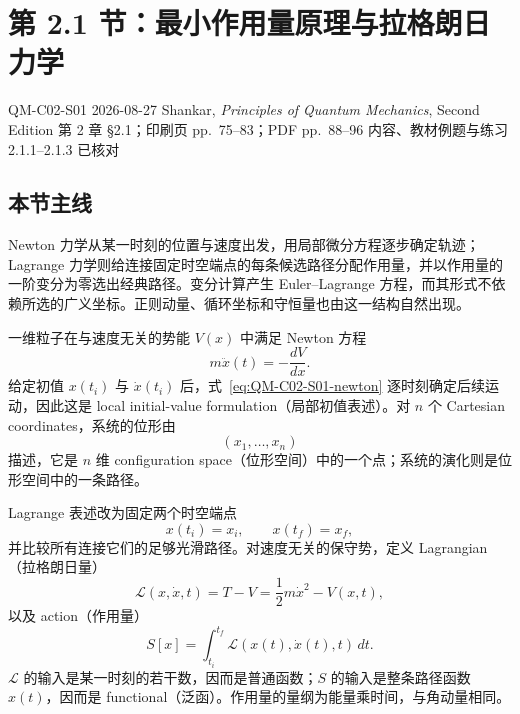 \section{第 2.1 节：最小作用量原理与拉格朗日力学}
\label{section:QM-C02-S01}

\studymeta
  {QM-C02-S01}
  {2026-08-27}
  {Shankar, \textit{Principles of Quantum Mechanics}, Second Edition}
  {第 2 章 \S 2.1；印刷页 pp.~75--83；PDF pp.~88--96}
  {内容、教材例题与练习 2.1.1--2.1.3 已核对}

\subsection{本节主线}

Newton 力学从某一时刻的位置与速度出发，用局部微分方程逐步确定轨迹；Lagrange 力学则给连接固定时空端点的每条候选路径分配作用量，并以作用量的一阶变分为零选出经典路径。变分计算产生 Euler--Lagrange 方程，而其形式不依赖所选的广义坐标。正则动量、循环坐标和守恒量也由这一结构自然出现。


一维粒子在与速度无关的势能 $V(x)$ 中满足 Newton 方程
\begin{equation}
  m\ddot x(t)=-\frac{dV}{dx}.
  \label{eq:QM-C02-S01-newton}
\end{equation}
给定初值 $x(t_i)$ 与 $\dot x(t_i)$ 后，式~\eqref{eq:QM-C02-S01-newton} 逐时刻确定后续运动，因此这是 local initial-value formulation（局部初值表述）。对 $n$ 个 Cartesian coordinates，系统的位形由
\[
  (x_1,\ldots,x_n)
\]
描述，它是 $n$ 维 configuration space（位形空间）中的一个点；系统的演化则是位形空间中的一条路径。

Lagrange 表述改为固定两个时空端点
\begin{equation}
  x(t_i)=x_i,
  \qquad
  x(t_f)=x_f,
  \label{eq:QM-C02-S01-fixed-endpoints}
\end{equation}
并比较所有连接它们的足够光滑路径。对速度无关的保守势，定义 Lagrangian（拉格朗日量）
\begin{equation}
  \mathcal L(x,\dot x,t)=T-V
  =\frac12m\dot x^2-V(x,t),
  \label{eq:QM-C02-S01-lagrangian}
\end{equation}
以及 action（作用量）
\begin{equation}
  \boxed{
  S[x]
  =\int_{t_i}^{t_f}\mathcal L(x(t),\dot x(t),t)\,dt.}
  \label{eq:QM-C02-S01-action}
\end{equation}
$\mathcal L$ 的输入是某一时刻的若干数，因而是普通函数；$S$ 的输入是整条路径函数 $x(t)$，因而是 functional（泛函）。作用量的量纲为能量乘时间，与角动量相同。

